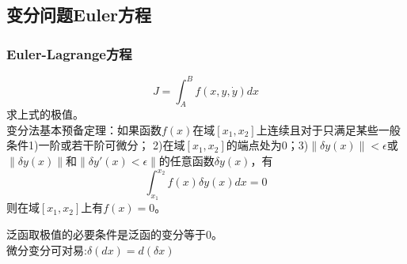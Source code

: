 \documentclass[12pt]{article}
\numberwithin{equation}{section}
\begin{document}
        \subsection{变分问题Euler方程}

        \subsubsection{Euler-Lagrange方程}

        \begin{equation}
            J=\int_A^Bf(x,y,\dot{y})dx
        \end{equation}
        求上式的极值。\\
        变分法基本预备定理：如果函数$f(x)$在域$[x_1,x_2]$上连续且对于只满足某些一般条件1)一阶或若干阶可微分；
        2)在域$[x_1,x_2]$的端点处为0；3)$\|\delta y(x)\|<\epsilon$或
        $\|\delta y(x)\|$和$\|\delta y'(x)<\epsilon\|$的任意函数$\delta y(x)$，有
        $$\int_{x_1}^{x_2}f(x)\delta y(x)dx=0$$
        则在域$[x_1,x_2]$上有$f(x)=0$。

        \noindent 泛函取极值的必要条件是泛函的变分等于0。\\
        微分变分可对易:$\delta(dx)=d(\delta x)$
\end{document}
